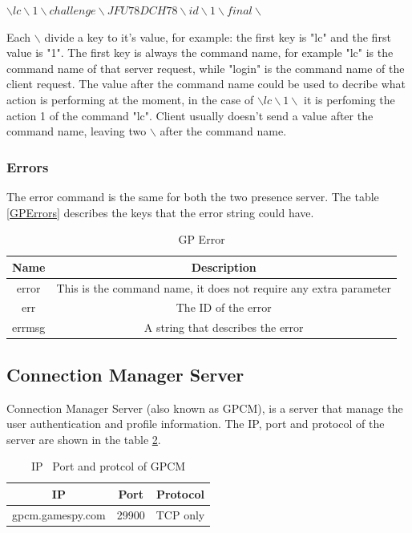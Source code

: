 \documentclass[oneside,titlepage,a4paper]{Definition/retrospy} %
\begin{document}
			\begin{tcolorbox}
				$ \backslash lc \backslash 1 \backslash challenge \backslash JFU78DCH78 \backslash id \backslash 1 \backslash final \backslash  $
				\label{Server example command}
			\end{tcolorbox}

			Each $ \backslash $ divide a key to it's value, for example: the first key is "lc" and the first value is "1".
			The first key is always the command name, for example "lc" is the command name of that server request, while "login" is the command name of the client request.
			The value after the command name could be used to decribe what action is performing at the moment, in the case of $ \backslash lc \backslash 1 \backslash $ it is perfoming the action 1 of the command "lc".
			Client usually doesn't send a value after the command name, leaving two $ \backslash $ after the command name.

			\subsubsection{Errors}
			The error command is the same for both the two presence server. The table \ref{GPErrors} describes the keys that the error string could have.
			
			\begin{table}[H]
				\centering
				\label{GPError}
				\caption{GP Error}
				\begin{tabular}{c|c}
					\hline
					\textbf{Name} & \textbf{Description} \\
					\hline
					error & This is the command name, it does not require any extra parameter \\
					\hline
					err & The ID of the error \\
					\hline
					errmsg & A string that describes the error \\
					\hline
				\end{tabular}
			\end{table}

		\newpage
		\subsection{Connection Manager Server}
		Connection Manager Server (also known as GPCM), is a server that manage the user authentication and profile information. The IP, port and protocol of the server are shown in the table \ref{GPCMInfo}.
		
		\begin{table}[H]
			\centering
			\begin{tabular}{c|c|c}
				\hline 
				\textbf{IP} & \textbf{Port} & \textbf{Protocol} \\ 
				\hline 
				gpcm.gamespy.com & 29900 & TCP only \\ 
			 	\hline
			\end{tabular} 
		\caption{IP \, Port and protcol of GPCM}
		\label{GPCMInfo}
	\end{table}
\end{document}
